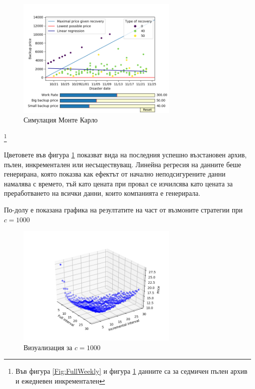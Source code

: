 \documentclass[11pt, a4paper]{article}
\theoremstyle{definition}
\newcommand\blfootnote[1]{%
	\begingroup
	\renewcommand\thefootnote{}\footnote{#1}%
	\addtocounter{footnote}{-1}%
	\endgroup
}
\begin{document}
		\begin{figure}[H]
			\begin{minipage}{1.0\textwidth}
				\centering
				\includegraphics[width=0.7\textwidth]{Weekly_full_carlo.png}
				\caption{Симулация Монте Карло}\label{Fig:MonteCarlo}
			\end{minipage}
		\end{figure}
		\blfootnote{Във фигура \ref{Fig:FullWeekly} и фигура \ref{Fig:MonteCarlo} данните са за седмичен пълен архив и ежедневен инкрементален}
		Цветовете във фигура \ref{Fig:MonteCarlo} показват вида на последния успешно възстановен архив, пълен, инкрементален или несъществуващ.
		Линейна регресия на данните беше генерирана, която показва как ефектът от начално неподсигурените данни намалява с времето, тъй като цената при провал се изчилсява като цената за преработването на всички данни, които компанията е генерирала.\par
		По-долу е показана графика на резултатите на част от възмоните стратегии при $c = 1000$
		\begin{figure}[H]
			\begin{minipage}{1.0\textwidth}
				\centering
				\includegraphics[width=0.7\textwidth]{3d_all_1.png}
				\caption{Визуализация за $c=1000$}\label{Fig:Whole_model}
			\end{minipage}
		\end{figure}
\end{document}
